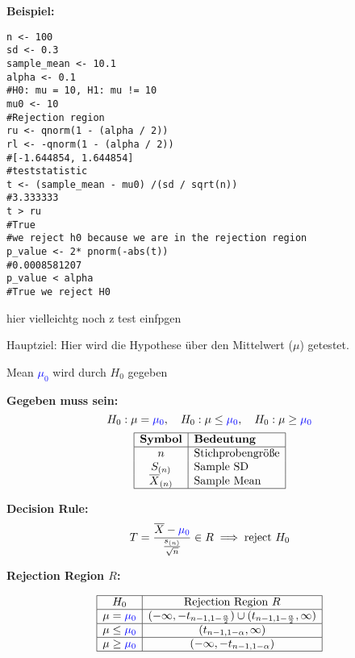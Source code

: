 \large{\textbf{Beispiel:}}
\begin{lstlisting}
n <- 100
sd <- 0.3
sample_mean <- 10.1
alpha <- 0.1
#H0: mu = 10, H1: mu != 10
mu0 <- 10
#Rejection region
ru <- qnorm(1 - (alpha / 2))
rl <- -qnorm(1 - (alpha / 2))
#[-1.644854, 1.644854]
#teststatistic
t <- (sample_mean - mu0) /(sd / sqrt(n))
#3.333333
t > ru
#True
#we reject h0 because we are in the rejection region
p_value <- 2* pnorm(-abs(t))
#0.0008581207
p_value < alpha
#True we reject H0 

\end{lstlisting}
hier vielleichtg noch z test einfpgen
\columnbreak
\begin{center}
\end{center}
\normalsize
Hauptziel: Hier wird die Hypothese über den Mittelwert ($\mu$) getestet.
\begin{center}

\textcolor{red}{\warning} Mean \textcolor{blue}{$\mu_0$} wird durch $H_0$ gegeben \textcolor{red}{\warning}
\end{center}
\large{\textbf{Gegeben muss sein:}}
\[
H_0: \mu = \textcolor{blue}{\mu_0}, \quad H_0: \mu \leq \textcolor{blue}{\mu_0}, \quad H_0: \mu \geq \textcolor{blue}{\mu_0}
\]
\[
\begin{array}{|c|l|}
\hline
\textbf{Symbol} & \textbf{Bedeutung} \\
\hline
n & \text{Stichprobengröße} \\
S_{(n)} & \text{Sample SD} \\
\overline{X}_{(n)} & \text{Sample Mean} \\
\hline
\end{array}
\]

\begin{comment}
\large{\textbf{Teststatistik:}}

\[
T = \frac{\overline{X}_{(n)} - \textcolor{blue}{\mu}}{\frac{s_{(n)}}{\sqrt{n}}} \sim t_{n-1},\text{with }
s^2_{(n)} = \frac{1}{n-1} \sum_{i=1}^n (X_i - \overline{X}_{(n)})^2
\]
\end{comment}
\large{\textbf{Decision Rule:}}
\[
T = \frac{\overline{X} - \textcolor{blue}{\mu_0}}{\frac{s_{(n)}}{\sqrt{n}}} \in R \implies \text{reject } H_0
\]

\large{\textbf{Rejection Region \(R\):}}

\[
\begin{array}{|c|c|}
\hline
H_0 & \text{Rejection Region } R \\ \hline
\mu = \textcolor{blue}{\mu_0} & (-\infty, -t_{n-1, 1-\frac{\alpha}{2}}) \cup (t_{n-1, 1-\frac{\alpha}{2}}, \infty) \\ \hline
\mu \leq \textcolor{blue}{\mu_0} & (t_{n-1, 1-\alpha}, \infty) \\ \hline
\mu \geq \textcolor{blue}{\mu_0} & (-\infty, -t_{n-1, 1-\alpha}) \\ \hline
\end{array}
\]
\centering{}

